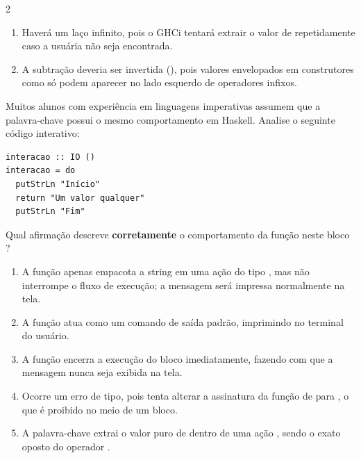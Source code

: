 \documentclass[a4paper,10pt,brazil]{article}
\begin{document}
\begin{multicols}{2}
\begin{enumerate}
  \item Haverá um laço infinito, pois o GHCi tentará extrair o valor de  repetidamente caso a usuária não seja encontrada.

  \item A subtração deveria ser invertida (), pois valores envelopados em construtores como  só podem aparecer no lado esquerdo de operadores infixos.


\end{enumerate}

Muitos alunos com experiência em linguagens imperativas assumem que a palavra-chave  possui o mesmo comportamento em Haskell. Analise o seguinte código interativo:

\begin{verbatim}
interacao :: IO ()
interacao = do
  putStrLn "Início"
  return "Um valor qualquer"
  putStrLn "Fim"
\end{verbatim}

Qual afirmação descreve \textbf{corretamente} o comportamento da função  neste bloco ?

\begin{enumerate}
  \item A função  apenas empacota a string em uma ação do tipo , mas não interrompe o fluxo de execução; a mensagem  será impressa normalmente na tela.

  \item A função  atua como um comando de saída padrão, imprimindo  no terminal do usuário.

  \item A função  encerra a execução do bloco  imediatamente, fazendo com que a mensagem  nunca seja exibida na tela.

  \item Ocorre um erro de tipo, pois  tenta alterar a assinatura da função de  para , o que é proibido no meio de um bloco.

  \item A palavra-chave  extrai o valor puro de dentro de uma ação , sendo o exato oposto do operador \haskellinline{<-}.



\end{enumerate}
\end{multicols}
\end{document}
